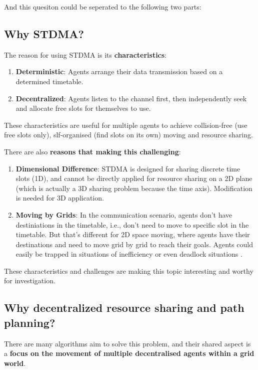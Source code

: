 And this quesiton could be seperated to the following two parts:

\subsection{Why STDMA?}

The reason for using STDMA is its \textbf{characteristics}\cite{STDMA_characteristic}:

\begin{enumerate}
    \item \textbf{Deterministic}: Agents arrange their data transmission based on a determined timetable.
    \item \textbf{Decentralized}: Agents listen to the channel first, then independently seek and allocate free slots for themselves to use.
\end{enumerate}

These characteristics are useful for multiple agents to achieve collision-free (use free slots only), slf-organised (find slots on its own) moving and resource sharing.

There are also \textbf{reasons that making this challenging}:
\begin{enumerate}
    \item \textbf{Dimensional Difference}: STDMA is designed for sharing discrete time slots (1D), and cannot be directly applied for resource sharing on a 2D plane (which is actually a 3D sharing problem because the time axis). Modification is needed for 3D application.
    \item \textbf{Moving by Grids}: In the communication scenario, agents don't have destiniations in the timetable, i.e., don't need to move to specific slot in the timetable. But that's different for 2D space moving, where agents have their destinations and need to move grid by grid to reach their goals. Agents could easily be trapped in situations of inefficiency or even deadlock situations \cite{MAPF_Deadlock_Explain1,MAPF_Deadlock_Explain2}.   
\end{enumerate}

These characteristics and challenges are making this topic interesting and worthy for investigation.

\subsection{Why decentralized resource sharing and path planning?}

There are many algorithms aim to solve this problem, and their shared aspect is a \textbf{focus on the movement of multiple decentralised agents within a grid world}. 

